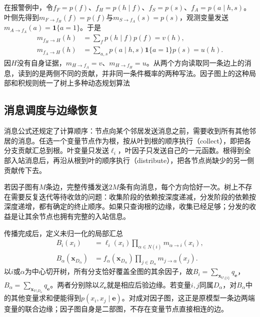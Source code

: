 在报警例中，令$f_F=p(f)$、$f_H=p(h\mid f)$、$f_S=p(s)$、$f_A=p(a\mid h,s)$。叶侧先得到$m_{F\to f_H}(f)=p(f)$与$m_{S\to f_A}(s)=p(s)$，观测变量发送$m_{A\to f_A}(a)=\mathbf{1}\{a=1\}$。于是
\[
  \begin{aligned}
    m_{f_H\to H}(h)&=\sum_f p(h\mid f)p(f)=v(h),\\
    m_{f_A\to H}(h)&=\sum_{a,s}p(a\mid h,s)
       \mathbf{1}\{a=1\}p(s)=u(h).
  \end{aligned}
\]
因$H$没有自身证据，$m_{H\to f_A}=v$、$m_{H\to f_H}=u$。从两个方向读取同一条边上的消息，读到的是两侧不同的贡献，并非同一条件概率的两种写法。因子图上的这种局部和积规则统一了树上多种动态规划算法

\subsection{消息调度与边缘恢复}
\label{sec:pgm-junction-tree-scheduling}

消息公式还规定了计算顺序：节点向某个邻居发送消息之前，需要收到所有其他邻居的消息。任选一个变量节点作为根，按从叶到根的顺序执行（collect），即把各分支贡献汇总到根。叶变量只发送$\ell_i$，叶因子只发送自己的一元函数。根得到全部入站消息后，再沿从根到叶的顺序执行（distribute），把各节点尚缺少的另一侧贡献传下去。

若因子图有$M$条边，完整传播发送$2M$条有向消息，每个方向恰好一次。树上不存在需要反复迭代等待收敛的问题：收集阶段的依赖按深度递减，分发阶段的依赖按深度递增，都有确定的终止顺序。如果只查询根的边缘，收集已经足够；分发的收益是让其余节点也拥有完整的入站信息。

传播完成后，定义未归一化的局部汇总
\begin{equation}
  \begin{aligned}
    B_i(x_i)&=\ell_i(x_i)\prod_{\alpha\in N(i)}
       m_{\alpha\to i}(x_i),\\
    B_\alpha(\bm{x}_{D_\alpha})
      &=f_\alpha(\bm{x}_{D_\alpha})
        \prod_{j\in D_\alpha}m_{j\to\alpha}(x_j).
  \end{aligned}
  \label{eq:pgm-junction-tree-factor-beliefs}
\end{equation}
以$i$或$\alpha$为中心切开树，所有分支恰好覆盖全图的其余因子，故$B_i=\sum_{\bm{x}_{V\setminus\{i\}}}q_{\bm{e}}$，$B_\alpha=\sum_{\bm{x}_{V\setminus D_\alpha}}q_{\bm{e}}$。两者分别除以$Z_{\bm{e}}$就是相应后验边缘。若变量$i,j$同属$D_\alpha$，对$B_\alpha$中的其他变量求和便能得到$p(x_i,x_j\mid\bm{e})$。对成对因子图，这正是原模型一条边两端变量的联合边缘；因子图自身是二部图，不存在变量节点直接相连的边。

